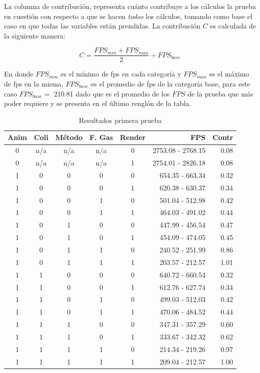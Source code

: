 La columna de contribución, representa cuánto contribuye a los cálculos la prueba en cuestión con respecto a que se hacen \emph{todos} los cálculos, tomando como base el caso en que todas las variables están prendidas. La contribución $C$ es calculada de la siguiente manera:

$$ C = \frac{FPS_{min} + FPS_{max}}{2} \div FPS_{base}$$

En donde $FPS_{min}$ es el mínimo de fps en cada categoría y $FPS_{max}$ es el máximo de fps en la misma, $FPS_{base}$ es el promedio de fps de la categoría base, para este caso $FPS_{base} =$ 210.81 dado que es el promedio de los $FPS$ de la prueba que más poder requiere y se presenta en el último renglón de la tabla.

\begin{table}
\begin{center}
\begin{tabular} {@{}cccccrr@{}}
\toprule
 Anim & Coli & Método & F. Gas & Render & FPS & Contr\\
\midrule
 0 & n/a & n/a & n/a & 0 & 2753.08 - 2768.15 & 0.08\\
 0 & n/a & n/a & n/a & 1 & 2754.01 - 2826.18 & 0.08\\
 1 & 0 & 0 & 0 & 0 & 654.35 - 663.34 & 0.32\\
 1 & 0 & 0 & 0 & 1 & 620.38 - 630.37 & 0.34\\
 1 & 0 & 0 & 1 & 0 & 501.04 - 512.98 & 0.42\\
 1 & 0 & 0 & 1 & 1 & 464.03 - 491.02 & 0.44\\
 1 & 0 & 1 & 0 & 0 & 447.99 - 456.54 & 0.47\\
 1 & 0 & 1 & 0 & 1 & 454.09 - 474.05 & 0.45\\
 1 & 0 & 1 & 1 & 0 & 240.52 - 251.99 & 0.86\\
 1 & 0 & 1 & 1 & 1 & 203.57 - 212.57 & 1.01\\
 1 & 1 & 0 & 0 & 0 & 640.72 - 660.54 & 0.32\\
 1 & 1 & 0 & 0 & 1 & 612.76 - 627.74 & 0.34\\
 1 & 1 & 0 & 1 & 0 & 499.03 - 512.03 & 0.42\\
 1 & 1 & 0 & 1 & 1 & 470.06 - 484.52 & 0.44\\
 1 & 1 & 1 & 0 & 0 & 347.31 - 357.29 & 0.60\\
 1 & 1 & 1 & 0 & 1 & 333.67 - 342.32 & 0.62\\
 1 & 1 & 1 & 1 & 0 & 214.34 - 219.26 & 0.97\\
 1 & 1 & 1 & 1 & 1 & 209.04 - 212.57 & 1.00\\
\bottomrule
\end{tabular}
\end{center}
\caption[Resultados de la prueba del programa]{Resultados primera prueba}
\label{resultado:prueba1}
\end{table}

